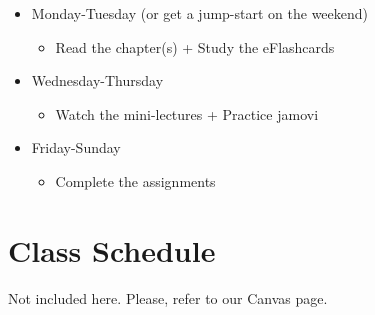 \documentclass[11pt,]{article}
\providecommand{\tightlist}{%
  \setlength{\itemsep}{0pt}\setlength{\parskip}{0pt}}
\begin{document}
\begin{itemize}
\tightlist
\item
  Monday-Tuesday (or get a jump-start on the weekend)

  \begin{itemize}
  \tightlist
  \item
    Read the chapter(s) + Study the eFlashcards
  \end{itemize}
\item
  Wednesday-Thursday

  \begin{itemize}
  \tightlist
  \item
    Watch the mini-lectures + Practice jamovi
  \end{itemize}
\item
  Friday-Sunday

  \begin{itemize}
  \tightlist
  \item
    Complete the assignments
  \end{itemize}
\end{itemize}

\hypertarget{class-schedule}{%
\section{Class Schedule}\label{class-schedule}}

Not included here. Please, refer to our Canvas page.
\end{document}
